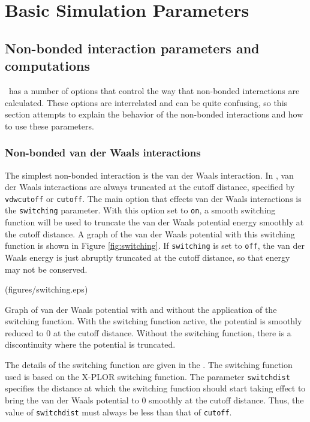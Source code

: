 \section{Basic Simulation Parameters}
\label{section:basic}


\subsection{Non-bonded interaction parameters and computations}
\label{section:electdesc}

\NAMD\ has a number of options that control the way that non-bonded
interactions are calculated.  These options are interrelated and
can be quite confusing, so this section attempts to explain the
behavior of the non-bonded interactions and how to use these
parameters.

\subsubsection{Non-bonded van der Waals interactions}
The simplest non-bonded 
interaction is the van der Waals interaction.  In 
\NAMD, van der Waals interactions are always truncated at the 
cutoff distance, specified by \verb!vdwcutoff! or \verb!cutoff!.  
The main option that effects van der Waals interactions
is the \verb!switching! parameter.  With this option set to \verb!on!,
a smooth switching function will be used to truncate the
van der Waals potential energy smoothly at the cutoff distance.  
A graph of the van der Waals 
potential with this switching function is shown in Figure 
\ref{fig:switching}.  If \verb!switching! is set to \verb!off!, the 
van der Waals energy is just abruptly truncated at the cutoff 
distance, so that energy may not be conserved.  

\displayepsf[htb] (figures/switching.eps) {
  \caption[Graph of van der Waals potential with and without switching]
  {{\small Graph of van der Waals potential with and without the
  application of the switching function.  With the switching function
  active, the potential is smoothly reduced to 0 at the cutoff distance.
  Without the switching function, there is a discontinuity where the
  potential is truncated.}}
  \label{fig:switching}
}

The details of the switching function are given in the \PG.
The switching function used is based on the X-PLOR switching
function.  The parameter \verb!switchdist! specifies the distance
at which the switching function should start taking effect to
bring the van der Waals potential to 0 smoothly at the cutoff distance.  
Thus, the value of \verb!switchdist! must always be less than that 
of \verb!cutoff!.


